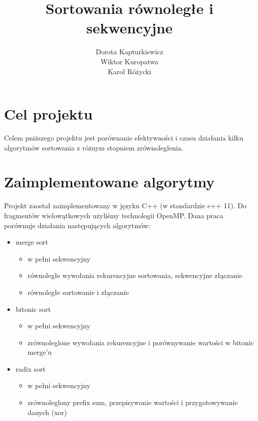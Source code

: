 \documentclass[11pt]{article}
\title{\textbf{Sortowania równoległe i sekwencyjne}}
\author{Dorota Kapturkiewicz\\
		Wiktor Kuropatwa\\
		Karol Różycki}
\date{}
\begin{document}
\maketitle

\section{Cel projektu}
Celem pniższego projektu jest porównanie efektywności i czasu działania kilku algorytmów sortowania z różnym stopniem zrównoleglenia.

\section{Zaimplementowane algorytmy}
Projekt zaostał zaimplementowany w języku C++ (w standardzie c++ 11).
Do fragmentów wielowątkowych użyliśmy technologii OpenMP. \newline
Dana praca porównuje działania następujących algorytmów:
\begin{itemize}

\item merge sort 
\begin{itemize}
\item w pełni sekwencyjny 
\item równoległe wywołania rekurencyjne sortowania, sekwencyjne złączanie
\item równoległe sortowanie i złączanie
\end{itemize}

\item bitonic sort
\begin{itemize}
\item w pełni sekwencyjny 
\item zrównoleglone wywołania rekurencyjne i porównywanie wartości w bitonic merge'u
\end{itemize}

\item radix sort
\begin{itemize}
\item w pełni sekwencyjny 
\item zrównoleglony prefix sum, przepisywanie wartości i przygotowywanie danych (xor)
\end{itemize}

\end{itemize}
\end{document}
